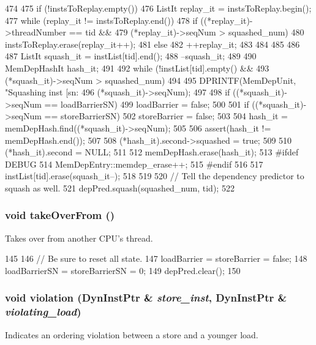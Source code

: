 \begin{DoxyCode}
474 {
475     if (!instsToReplay.empty()) {
476         ListIt replay_it = instsToReplay.begin();
477         while (replay_it != instsToReplay.end()) {
478             if ((*replay_it)->threadNumber == tid &&
479                 (*replay_it)->seqNum > squashed_num) {
480                 instsToReplay.erase(replay_it++);
481             } else {
482                 ++replay_it;
483             }
484         }
485     }
486 
487     ListIt squash_it = instList[tid].end();
488     --squash_it;
489 
490     MemDepHashIt hash_it;
491 
492     while (!instList[tid].empty() &&
493            (*squash_it)->seqNum > squashed_num) {
494 
495         DPRINTF(MemDepUnit, "Squashing inst [sn:%
496                 (*squash_it)->seqNum);
497 
498         if ((*squash_it)->seqNum == loadBarrierSN)
499               loadBarrier = false;
500 
501         if ((*squash_it)->seqNum == storeBarrierSN)
502               storeBarrier = false;
503 
504         hash_it = memDepHash.find((*squash_it)->seqNum);
505 
506         assert(hash_it != memDepHash.end());
507 
508         (*hash_it).second->squashed = true;
509 
510         (*hash_it).second = NULL;
511 
512         memDepHash.erase(hash_it);
513 #ifdef DEBUG
514         MemDepEntry::memdep_erase++;
515 #endif
516 
517         instList[tid].erase(squash_it--);
518     }
519 
520     // Tell the dependency predictor to squash as well.
521     depPred.squash(squashed_num, tid);
522 }
\end{DoxyCode}
\hypertarget{classMemDepUnit_a8674059ce345e23aac5086b2c3e24a43}{
\subsubsection[{takeOverFrom}]{\setlength{\rightskip}{0pt plus 5cm}void takeOverFrom ()}}
\label{classMemDepUnit_a8674059ce345e23aac5086b2c3e24a43}
Takes over from another CPU's thread. 


\begin{DoxyCode}
145 {
146     // Be sure to reset all state.
147     loadBarrier = storeBarrier = false;
148     loadBarrierSN = storeBarrierSN = 0;
149     depPred.clear();
150 }
\end{DoxyCode}
\hypertarget{classMemDepUnit_aac3ab1b2d6cc44bd1e7c42bf39538316}{
\subsubsection[{violation}]{\setlength{\rightskip}{0pt plus 5cm}void violation ({\bf DynInstPtr} \& {\em store\_\-inst}, \/  {\bf DynInstPtr} \& {\em violating\_\-load})}}
\label{classMemDepUnit_aac3ab1b2d6cc44bd1e7c42bf39538316}
Indicates an ordering violation between a store and a younger load. 


